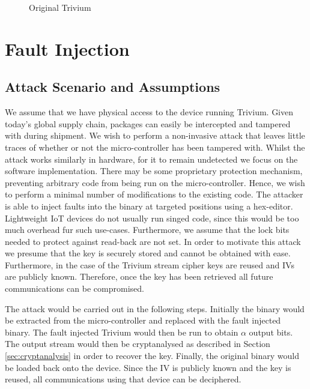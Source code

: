 \documentclass[conference]{IEEEtran}
\begin{document}
\begin{figure}[H]
\centering

\caption{Original Trivium}
\label{fig:original}
\end{figure}

\section{Fault Injection}\label{sec:fault-inj}

\subsection{Attack Scenario and Assumptions}

We assume that we have physical access to the device running Trivium. Given today's global supply chain, packages can easily be intercepted and tampered with during shipment. We wish to perform a non-invasive attack that leaves little traces of whether or not the micro-controller has been tampered with. Whilst the attack works similarly in hardware, for it to remain undetected we focus on the software implementation. There may be some proprietary protection mechanism, preventing arbitrary code from being run on the micro-controller. Hence, we wish to perform a minimal number of modifications to the existing code. The attacker is able to inject faults into the binary at targeted positions using a hex-editor. Lightweight IoT devices do not usually run singed code, since this would be too much overhead fur such use-cases. Furthermore, we assume that the lock bits needed to protect against read-back are not set. In order to motivate this attack we presume that the key is securely stored and cannot be obtained with ease. Furthermore,
in the case of the Trivium stream cipher keys are reused and IVs are publicly known. Therefore, once the key has been retrieved all future communications can be compromised. 

The attack would be carried out in the following steps. Initially the binary would be extracted from the micro-controller and replaced with the fault injected binary. The fault injected Trivium would then be run to obtain $\alpha$ output bits. The output stream would then be cryptanalysed as described in Section \ref{sec:cryptanalysis} in order to recover the key. Finally, the original binary would be loaded back onto the device. Since the IV is publicly known and the key is reused, all communications using that device can be deciphered.
\end{document}
